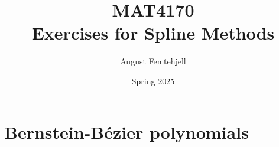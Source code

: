 \documentclass[
    a4paper,
    12pt,
]{article}
\title{
    MAT4170\\
    \small{Exercises for Spline Methods}
}
\author{August Femtehjell}
\date{Spring 2025}
\theoremstyle{exerciseStyle}
\theoremstyle{solutionStyle}
\begin{document}
\maketitle

\tableofcontents

\section{Bernstein-Bézier polynomials}


\end{document}
